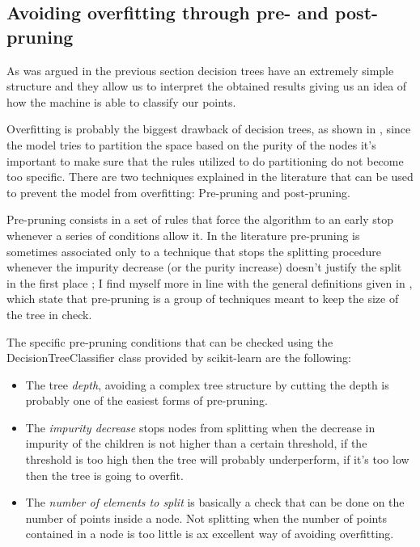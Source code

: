 \subsection{Avoiding overfitting through pre- and post- pruning}
As was argued in the previous section decision trees have an extremely simple structure and they
allow us to interpret the obtained results giving us an idea of how the machine is able to classify
our points.

Overfitting is probably the biggest drawback of decision trees, as shown in
\cite{overfitting-dt-erblin}, since the model tries to partition the space based on the purity of
the nodes it's important to make sure that the rules utilized to do partitioning do not become too
specific. There are two techniques explained in the literature that can be used to prevent the model
from overfitting: Pre-pruning and post-pruning.

\medskip

Pre-pruning consists in a set of rules that force the algorithm to an early stop whenever a series
of conditions allow it. In the literature pre-pruning is sometimes associated only to a technique
that stops the splitting procedure whenever the impurity decrease (or the purity increase) doesn't
justify the split in the first place \cite{ZhouZhi-Hua2021ML}; I find myself more in line with
the general definitions given in \cite{bramer2007principles}\cite{fisher1996learning}, which
state that pre-pruning is a group of techniques meant to keep the size of the tree in check.

The specific pre-pruning conditions that can be checked using the DecisionTreeClassifier class provided by
scikit-learn are the following:
\begin{itemize}
	\item The tree \emph{depth}, avoiding a complex tree structure by cutting the depth is
	      probably one of the easiest forms of pre-pruning.
	\item The \emph{impurity decrease} stops nodes from splitting when the decrease in impurity
	      of the children is not higher than a certain threshold, if the threshold is too high
	      then the tree will probably underperform, if it's too low then the tree is going to
	      overfit.
	\item The \emph{number of elements to split} is basically a check that can be done on the
	      number of points inside a node. Not splitting when the number of points
	      contained in a node is too little is ax excellent way of avoiding overfitting.
\end{itemize}

